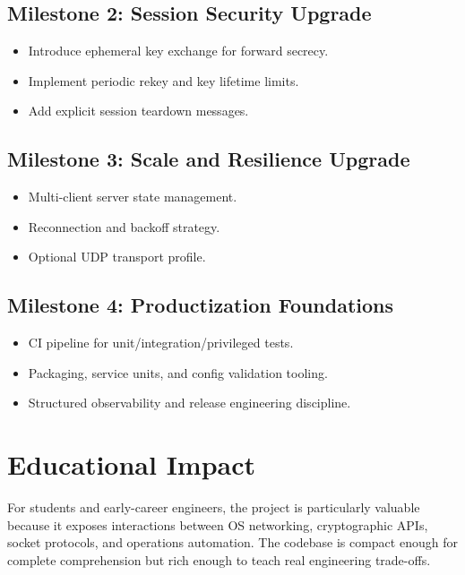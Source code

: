 \subsection{Milestone 2: Session Security Upgrade}
\begin{itemize}[leftmargin=2em]
\item Introduce ephemeral key exchange for forward secrecy.
\item Implement periodic rekey and key lifetime limits.
\item Add explicit session teardown messages.
\end{itemize}

\subsection{Milestone 3: Scale and Resilience Upgrade}
\begin{itemize}[leftmargin=2em]
\item Multi-client server state management.
\item Reconnection and backoff strategy.
\item Optional UDP transport profile.
\end{itemize}

\subsection{Milestone 4: Productization Foundations}
\begin{itemize}[leftmargin=2em]
\item CI pipeline for unit/integration/privileged tests.
\item Packaging, service units, and config validation tooling.
\item Structured observability and release engineering discipline.
\end{itemize}

\section{Educational Impact}
For students and early-career engineers, the project is particularly valuable because it exposes interactions between OS networking, cryptographic APIs, socket protocols, and operations automation. The codebase is compact enough for complete comprehension but rich enough to teach real engineering trade-offs.

